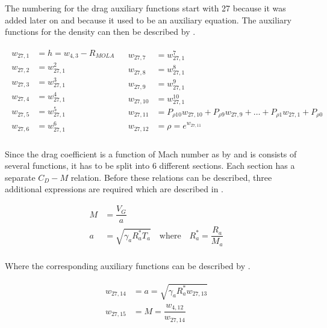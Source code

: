 \noindent
The numbering for the drag auxiliary functions start with 27 because it was added later on and because it used to be an auxiliary equation. The auxiliary functions for the density can then be described by .

\begin{align} \label{eq:dragAuxF}
\begin{split}
w_{27,1} &= h = w_{4,3} - R_{MOLA} \\
w_{27,2} &= w_{27,1}^{2}\\
w_{27,3} &= w_{27,1}^{3}\\
w_{27,4} &= w_{27,1}^{4}\\
w_{27,5} &= w_{27,1}^{5}\\
w_{27,6} &= w_{27,1}^{6}\\
\end{split}
&
\begin{split}
w_{27,7} &= w_{27,1}^{7}\\
w_{27,8} &= w_{27,1}^{8}\\
w_{27,9} &= w_{27,1}^{9}\\
w_{27,10} &= w_{27,1}^{10}\\
w_{27,11} &= P_{\rho 10}w_{27,10}+P_{\rho 9}w_{27,9}+\dotsc +P_{\rho 1}w_{27,1}+P_{\rho 0}\\
w_{27,12} &= \rho = e^{w_{27,11}} \\
\end{split}
\end{align}

\noindent
Since the drag coefficient is a function of Mach number as by  and is consists of several functions, it has to be split into 6 different sections. Each section has a separate $C_{D}-M$ relation. Before these relations can be described, three additional expressions are required which are described in .

 \begin{equation} \label{eq:cd}
\begin{split}
M &= \dfrac{V_{G}}{a} \\
a &= \sqrt{\gamma_{a}R_{a}^{*}T_{a}} \quad \text{where} \quad R_{a}^{*}=\dfrac{R_{a}}{M_{a}} \\
\end{split}
\end{equation}

\noindent
Where the corresponding auxiliary functions can be described by .

\begin{align} \label{eq:cdAuxF}
\begin{split}
w_{27,14} &= a = \sqrt{\gamma_{a}R_{a}^{*}w_{27,13}}  \\
w_{27,15} &= M = \dfrac{w_{4,12}}{w_{27,14}} \\
\end{split}
\end{align}

